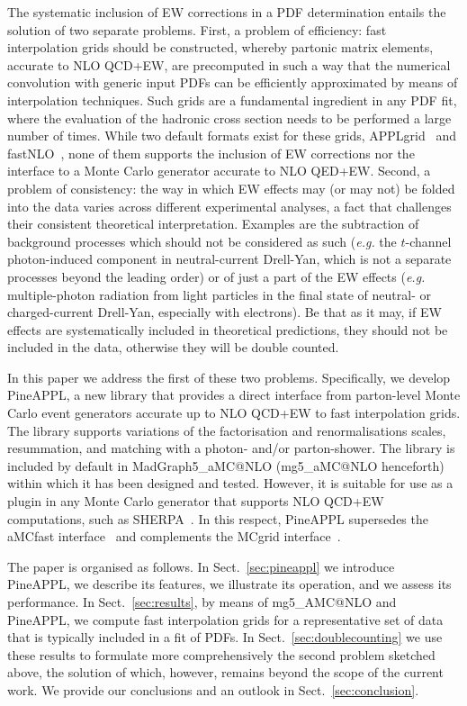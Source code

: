 The systematic inclusion of EW corrections in a PDF determination entails
the solution of two separate problems. First, a problem of efficiency:
fast interpolation grids should be constructed, whereby partonic matrix 
elements, accurate to NLO QCD+EW, are precomputed in such a way that the 
numerical convolution with generic input PDFs can be efficiently approximated
by means of interpolation techniques. Such grids are a fundamental ingredient
in any PDF fit, where the evaluation of the hadronic cross section needs to 
be performed a large number of times. While two default formats exist for
these grids, {\sc APPLgrid}~\cite{Carli:2010rw} and 
{\sc fastNLO}~\cite{Kluge:2006xs}, none of them supports the inclusion of EW
corrections nor the interface to a Monte Carlo generator accurate to 
NLO QED+EW. Second, a problem of consistency: the way in which EW effects may
(or may not) be folded into the data varies across different experimental 
analyses, a fact that challenges their consistent theoretical interpretation. 
Examples are the subtraction of background processes which should not be 
considered as such ({\it e.g.} the $t$-channel photon-induced component in 
neutral-current Drell-Yan, which is not a separate processes beyond the leading
order) or of just a part of the EW effects ({\it e.g.} multiple-photon 
radiation from light particles in the final state of neutral- or charged-current
Drell-Yan, especially with electrons). Be that as it may, if EW effects are 
systematically included in theoretical predictions, they should not be included 
in the data, otherwise they will be double counted.

In this paper we address the first of these two problems. Specifically, 
we develop {\sc PineAPPL}, a new library that provides a direct interface 
from parton-level Monte Carlo event generators accurate up to NLO QCD+EW to
fast interpolation grids. The library supports variations of the factorisation
and renormalisations scales, resummation, and matching with a photon- and/or
parton-shower. The library is included by default in 
{\sc MadGraph5\_aMC@NLO} ({\sc mg5\_aMC@NLO} henceforth) within which it has 
been designed and tested. However, it is suitable for use as a plugin in any 
Monte Carlo generator that supports NLO QCD+EW computations, such as 
{\sc SHERPA}~\cite{Biedermann:2017yoi}. In this respect, {\sc PineAPPL}
supersedes the {\sc aMCfast} interface~\cite{Bertone:2014zva} and complements
the {\sc MCgrid} interface~\cite{DelDebbio:2013kxa,Bothmann:2015dba}.

The paper is organised as follows. In Sect.~\ref{sec:pineappl} we introduce
{\sc PineAPPL}, we describe its features, we illustrate its operation, and we
assess its performance. In Sect.~\ref{sec:results}, by means of 
{\sc mg5\_AMC@NLO} and {\sc PineAPPL}, we compute fast interpolation grids for 
a representative set of data that is typically included in a fit of PDFs.
In Sect.~\ref{sec:doublecounting} we use these results to formulate more 
comprehensively the second problem sketched above, the solution of which, 
however, remains beyond the scope of the current work. We provide our
conclusions and an outlook in Sect.~\ref{sec:conclusion}.

